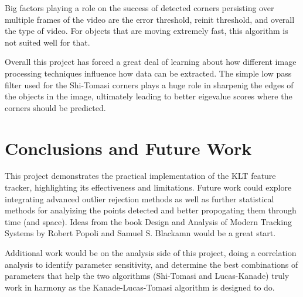 \documentclass[11pt, conference, letterpaper]{IEEEtran}
\begin{document}
Big factors playing a role on the success of detected corners persisting over multiple frames of the video are the error threshold, reinit threshold, and overall the type of video. For objects that are moving extremely fast, this algorithm is not suited well for that.

Overall this project has forced a great deal of learning about how different image processing techniques influence how data can be extracted. The simple low pass filter used for the Shi-Tomasi corners plays a huge role in sharpenig the edges of the objects in the image, ultimately leading to better eigevalue scores where the corners should be predicted.

\bigskip

\section{Conclusions and Future Work}
This project demonstrates the practical implementation of the KLT feature tracker, highlighting its effectiveness and limitations. Future work could explore integrating advanced outlier rejection methods as well as further statistical methods for analyizing the points detected and better propogating them through time (and space). Ideas from the book Design and Analysis of Modern Tracking Systems by Robert Popoli and Samuel S. Blackamn would be a great start.

Additional work would be on the analysis side of this project, doing a correlation analysis to identify parameter sensitivity, and determine the best combinations of parameters that help the two algorithms (Shi-Tomasi and Lucas-Kanade) truly work in harmony as the Kanade-Lucas-Tomasi algorithm is designed to do.
\end{document}
